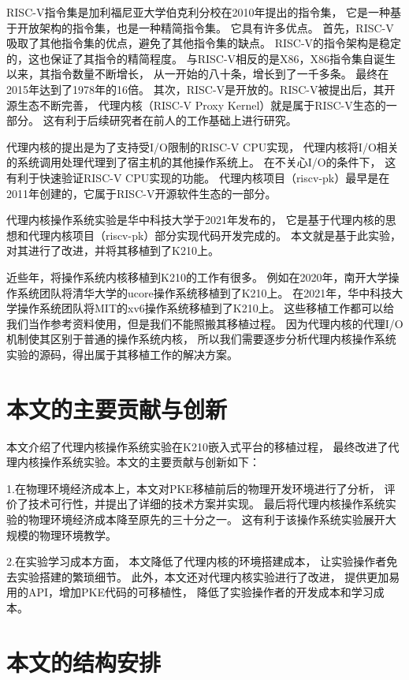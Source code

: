 RISC-V指令集是加利福尼亚大学伯克利分校在2010年提出的指令集，
它是一种基于开放架构的指令集，也是一种精简指令集\cite{雷思磊2017RISC}。
它具有许多优点。
首先，RISC-V吸取了其他指令集的优点，避免了其他指令集的缺点。
RISC-V的指令架构是稳定的，这也保证了其指令的精简程度。
与RISC-V相反的是X86，X86指令集自诞生以来，其指令数量不断增长，
从一开始的八十条，增长到了一千多条。
最终在2015年达到了1978年的16倍。
其次，RISC-V是开放的。RISC-V被提出后，其开源生态不断完善，
代理内核（RISC-V Proxy Kernel）就是属于RISC-V生态的一部分。
这有利于后续研究者在前人的工作基础上进行研究\cite{胡振波2019RISC}。

代理内核的提出是为了支持受I/O限制的RISC-V CPU实现，
代理内核将I/O相关的系统调用处理代理到了宿主机的其他操作系统上。
在不关心I/O的条件下，
这有利于快速验证RISC-V CPU实现的功能。
代理内核项目（riscv-pk）最早是在2011年创建的，它属于RISC-V开源软件生态的一部分。

代理内核操作系统实验是华中科技大学于2021年发布的，
它是基于代理内核的思想和代理内核项目（riscv-pk）部分实现代码开发完成的。
本文就是基于此实验，对其进行了改进，并将其移植到了K210上。

近些年，将操作系统内核移植到K210的工作有很多\cite{孙卫真2021基于}。
例如在2020年，南开大学操作系统团队将清华大学的ucore操作系统移植到了K210上。
在2021年，华中科技大学操作系统团队将MIT的xv6操作系统移植到了K210上。
这些移植工作都可以给我们当作参考资料使用，但是我们不能照搬其移植过程。
因为代理内核的代理I/O机制使其区别于普通的操作系统内核，
所以我们需要逐步分析代理内核操作系统实验的源码，得出属于其移植工作的解决方案。



\section{本文的主要贡献与创新}

本文介绍了代理内核操作系统实验在K210嵌入式平台的移植过程，
最终改进了代理内核操作系统实验。本文的主要贡献与创新如下：

1.在物理环境经济成本上，本文对PKE移植前后的物理开发环境进行了分析，
评价了技术可行性，并提出了详细的技术方案并实现。
最后将代理内核操作系统实验的物理环境经济成本降至原先的三十分之一。
这有利于该操作系统实验展开大规模的物理环境教学。

2.在实验学习成本方面，
本文降低了代理内核的环境搭建成本，
让实验操作者免去实验搭建的繁琐细节。
此外，本文还对代理内核实验进行了改进，
提供更加易用的API，增加PKE代码的可移植性，
降低了实验操作者的开发成本和学习成本。

\section{本文的结构安排}

